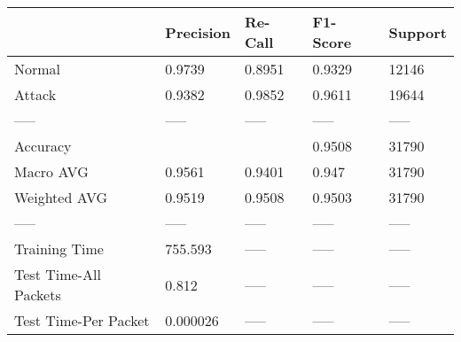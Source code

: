 \begin{tabular}{lllll}
\toprule
{} & Precision & Re-Call & F1-Score & Support \\
\midrule
Normal                &    0.9739 &  0.8951 &   0.9329 &   12146 \\
Attack                &    0.9382 &  0.9852 &   0.9611 &   19644 \\
-----                 &     ----- &   ----- &    ----- &   ----- \\
Accuracy              &           &         &   0.9508 &   31790 \\
Macro AVG             &    0.9561 &  0.9401 &    0.947 &   31790 \\
Weighted AVG          &    0.9519 &  0.9508 &   0.9503 &   31790 \\
-----                 &     ----- &   ----- &    ----- &   ----- \\
Training Time         &   755.593 &   ----- &    ----- &   ----- \\
Test Time-All Packets &     0.812 &   ----- &    ----- &   ----- \\
Test Time-Per Packet  &  0.000026 &   ----- &    ----- &   ----- \\
\bottomrule
\end{tabular}
